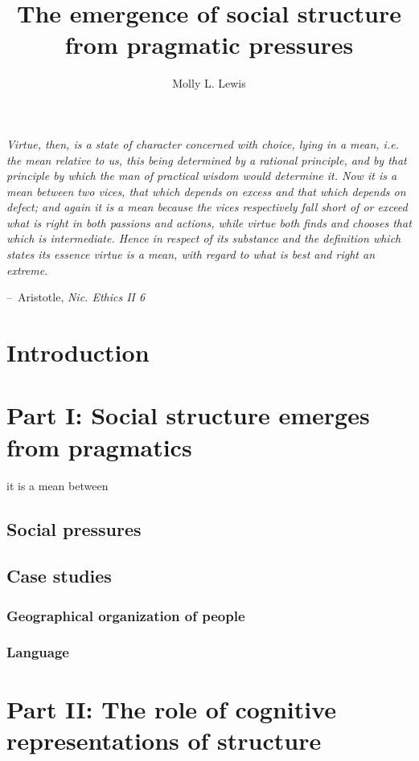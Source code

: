 \documentclass[man, noapacite]{apa2}
\title{The emergence of social structure from pragmatic pressures}
\author{Molly L. Lewis}
\affiliation{Department of Psychology, Stanford University\\ Conceptual Analysis of Dissertation Area\\ 6 October 2014}
\makeatletter
\newenvironment{chapquote}[2][2em]
  {\setlength{\@tempdima}{#1}%
   \def\chapquote@author{#2}%
   \parshape 1 \@tempdima \dimexpr\textwidth-2\@tempdima\relax%
   \itshape}
  {\par\normalfont\hfill--\ \chapquote@author\hspace*{\@tempdima}\par\bigskip}
\makeatother
\begin{document}
\maketitle

\begin{chapquote}{Aristotle, \textit{Nic. Ethics II 6}}
\noindent  Virtue, then, is a state of character concerned with choice, lying in a mean, i.e. the mean relative to us, this being determined by a rational principle, and by that principle by which the man of practical wisdom would determine it. Now it is a mean between two vices, that which depends on excess and that which depends on defect; and again it is a mean because the vices respectively fall short of or exceed what is right in both passions and actions, while virtue both finds and chooses that which is intermediate. Hence in respect of its substance and the definition which states its essence virtue is a mean, with regard to what is best and right an extreme.
\end{chapquote}
\section{Introduction}


\section{Part I: Social structure emerges from pragmatics}
 it is a mean between
\subsection{Social pressures}
\subsection{Case studies}
\subsubsection{Geographical organization of people}
\subsubsection{Language}
 

\section{Part II: The role of cognitive representations of structure }




\end{document}
